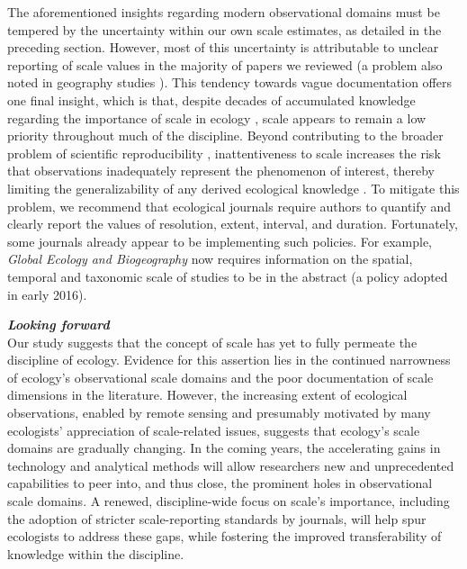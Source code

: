 \documentclass[12pt]{article}
\begin{document}
The aforementioned insights regarding modern observational domains must be tempered by the uncertainty within our own scale estimates, as detailed in the preceding section. However, most of this uncertainty is attributable to unclear reporting of scale values in the majority of papers we reviewed (a problem also noted in geography studies \cite{margulies_ambiguous_2016}). This tendency towards vague documentation offers one final insight, which is that, despite decades of accumulated knowledge regarding the importance of scale in ecology \cite{levin_problem_1992, wiens_spatial_1989, chave_problem_2013, wheatley_factors_2009}, scale appears to remain a low priority throughout much of the discipline. Beyond contributing to the broader problem of scientific reproducibility \cite{baker_1500_2016}, inattentiveness to scale increases the risk that observations inadequately represent the phenomenon of interest, thereby limiting the generalizability of any derived ecological knowledge \cite{margulies_ambiguous_2016, wheatley_factors_2009, wiens_spatial_1989}. To mitigate this problem, we recommend that ecological journals require authors to quantify and clearly report the values of resolution, extent, interval, and duration. Fortunately, some journals already appear to be implementing such policies. For example, \emph{Global Ecology and Biogeography} now requires information on the spatial, temporal and taxonomic scale of studies to be in the abstract (a policy adopted in early 2016).

\noindent \textbf{\emph{Looking forward}}\\
Our study suggests that the concept of scale has yet to fully permeate the discipline of ecology. Evidence for this assertion lies in the continued narrowness of ecology's observational scale domains and the poor documentation of scale dimensions in the literature. However, the increasing extent of ecological observations, enabled by remote sensing and presumably motivated by many ecologists' appreciation of scale-related issues, suggests that ecology's scale domains are gradually changing. In the coming years, the accelerating gains in technology and analytical methods will allow researchers new and unprecedented capabilities to peer into, and thus close, the prominent holes in observational scale domains. A renewed, discipline-wide focus on scale's importance, including the adoption of stricter scale-reporting standards by journals, will help spur ecologists to address these gaps, while fostering the improved transferability of knowledge within the discipline.  
\end{document}
